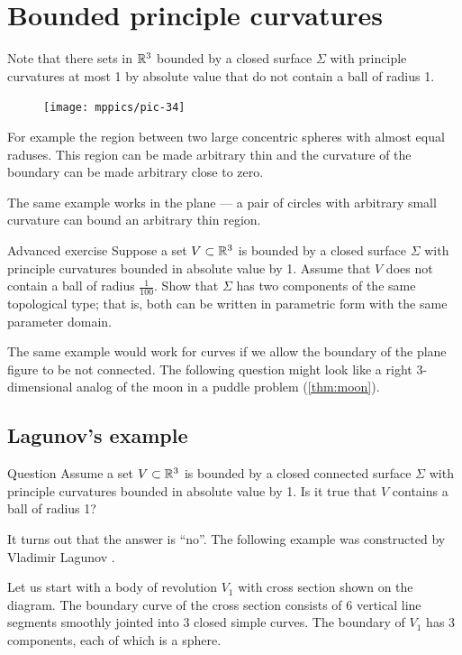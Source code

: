 \chapter{Bounded principle curvatures}

Note that there sets in $\mathbb{R}^3$ bounded by a closed surface $\Sigma$ with principle curvatures at most 1 by absolute value
that do not contain a ball of radius 1.

\begin{figure}
\vskip-4mm
\centering
\texttt{[image: mppics/pic-34]}
\vskip0mm
\end{figure}

For example the region between two large concentric spheres with almost equal raduses. 
This region can be made arbitrary thin and the curvature of the boundary can be made arbitrary close to zero.

The same example works in the plane --- a pair of circles with arbitrary small curvature can bound an arbitrary thin region.

\begin{thm}{Advanced exercise}
Suppose a set $V\subset \mathbb{R}^3$ is bounded by a closed surface $\Sigma$ with principle curvatures bounded in absolute value by 1.
Assume that $V$ does not contain a ball of radius $\tfrac1{100}$.
Show that $\Sigma$ has two components of the same topological type; 
that is, both can be written in parametric form with the same parameter domain. 
\end{thm}


The same example would work for curves if we allow the boundary of the plane figure to be not connected.
The following question might look like a right 3-dimensional analog of the moon in a puddle problem (\ref{thm:moon}).

\section*{Lagunov's example}

\begin{thm}{Question}
Assume a set $V\subset \mathbb{R}^3$ is bounded by a closed connected surface $\Sigma$ with 
principle curvatures bounded in absolute value by 1.
Is it true that $V$ contains a ball of radius 1?
\end{thm}

It turns out that the answer is  ``no''. The following example was constructed by Vladimir Lagunov \cite{lagunov}.


Let us start with a body of revolution $V_1$ with cross section shown on the diagram.
The boundary curve of the cross section consists of 6 vertical line segments smoothly jointed into 3 closed simple curves. 
The boundary of $V_1$ has 3 components, each of which is a sphere.

